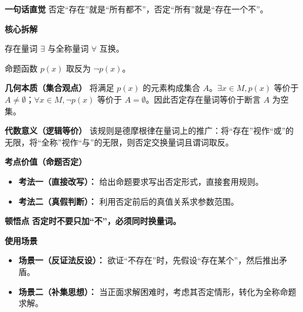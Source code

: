 \begin{explanationbox}
	\textbf{\textcolor{CExplanation}{一句话直觉}}
	否定“存在”就是“所有都不”，否定“所有”就是“存在一个不”。\par

	\medskip
	\textbf{\textcolor{CExplanation}{核心拆解}}
	\begin{description}[style=nextline, leftmargin=2.8em, labelsep=0.5em, itemsep=0.45em]
		\item[\textbf{要点一（量词互换）：}]
			存在量词 $\exists$ 与全称量词 $\forall$ 互换。
		\item[\textbf{要点二（谓词取反）：}]
			命题函数 $p(x)$ 取反为 $\neg p(x)$。
	\end{description}
	\par

	\medskip
	\textbf{\textcolor{CExplanation}{几何本质（集合观点）}}
	将满足 $p(x)$ 的元素构成集合 $A$。$\exists x\in M,p(x)$ 等价于 $A\neq\emptyset$；$\forall x\in M,\neg p(x)$ 等价于 $A=\emptyset$。因此否定存在量词等价于断言 $A$ 为空集。\par

	\medskip
	\textbf{\textcolor{CExplanation}{代数意义（逻辑等价）}}
	该规则是德摩根律在量词上的推广：将“存在”视作“或”的无限，将“全称”视作“与”的无限，则否定交换量词且谓词取反。\par

	\medskip
	\textbf{\textcolor{CExplanation}{考点价值（命题否定）}}
	\begin{itemize}[leftmargin=*, itemsep=0.5em, topsep=0.4em]
		\item\textbf{考法一（直接改写）：} 给出命题要求写出否定形式，直接套用规则。\item\textbf{考法二（真假判断）：} 利用否定前后的真值关系求参数范围。
	\end{itemize}
	\par

	\medskip
	\textbf{\textcolor{CExplanation}{顿悟点}}
	\textbf{否定时不要只加“不”，必须同时换量词。}\par

	\medskip
	\textbf{\textcolor{CExplanation}{使用场景}}
	\begin{itemize}[leftmargin=*, itemsep=0.5em, topsep=0.4em]
		\item\textbf{场景一（反证法反设）：} 欲证“不存在”时，先假设“存在某个”，然后推出矛盾。\item\textbf{场景二（补集思想）：} 当正面求解困难时，考虑其否定情形，转化为全称命题求解。
	\end{itemize}

\end{explanationbox}
